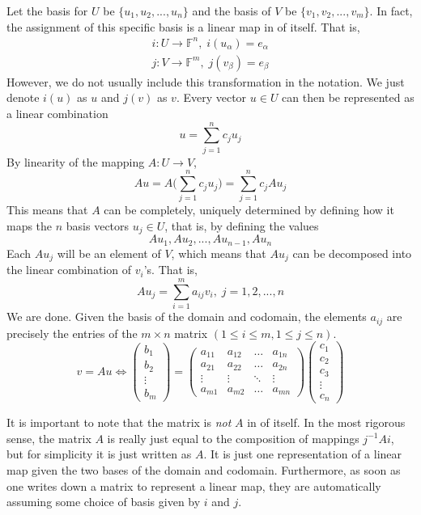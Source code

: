 \documentclass{article}
\theoremstyle{remark}
\theoremstyle{definition}
\begin{document}
    Let the basis for $U$ be $\{ u_1, u_2, ..., u_n\}$ and the basis of $V$ be $\{v_1, v_2, ..., v_m\}$. In fact, the assignment of this specific basis is a linear map in of itself. That is, 
    \begin{align*}
        i: U \longrightarrow \mathbb{F}^n, \; i(u_\alpha) = e_\alpha  \\
        j: V \longrightarrow \mathbb{F}^m, \; j(v_\beta) = e_\beta 
    \end{align*}
    However, we do not usually include this transformation in the notation. We just denote $i(u)$ as $u$ and $j(v)$ as $v$. Every vector $u \in U$ can then be represented as a linear combination
    \[u = \sum_{j=1}^n c_j u_j\]
    By linearity of the mapping $A: U \longrightarrow V$, 
    \[ A u = A \bigg( \sum_{j=1}^n c_j u_j \bigg) = \sum_{j=1}^n c_j A u_j \]
    This means that $A$ can be completely, uniquely determined by defining how it maps the $n$ basis vectors $u_j \in U$, that is, by defining the values 
    \[ A u_1, A u_2, ..., A u_{n-1}, A u_n\]
    Each $A u_j$ will be an element of $V$, which means that $A u_j$ can be decomposed into the linear combination of $v_i$'s. That is, 
    \[ A u_j = \sum_{i=1}^m a_{i j} v_i, \; j = 1, 2, ..., n \]
    We are done. Given the basis of the domain and codomain, the elements $a_{i j}$ are precisely the entries of the $m \times n$ matrix $(1 \leq i \leq m, 1 \leq j \leq n)$. 
    \[ v = A u \iff 
    \begin{pmatrix}
     b_1 \\ b_2 \\ \vdots \\ b_m
    \end{pmatrix}
    = \begin{pmatrix}
     a_{1 1} & a_{1 2} & \ldots & a_{1 n} \\
     a_{2 1} & a_{2 2} & \ldots & a_{2 n} \\
     \vdots & \vdots & \ddots & \vdots \\
     a_{m 1} & a_{m 2} & \ldots & a_{m n} 
    \end{pmatrix} \begin{pmatrix}
     c_1 \\ c_2 \\ c_3 \\ \vdots \\ c_n
    \end{pmatrix}\]

    It is important to note that the matrix is \textit{not} $A$ in of itself. In the most rigorous sense, the matrix $A$ is really just equal to the composition of mappings $ j^{-1} A i$, but for simplicity it is just written as $A$. It is just one representation of a linear map given the two bases of the domain and codomain. Furthermore, as soon as one writes down a matrix to represent a linear map, they are automatically assuming some choice of basis given by $i$ and $j$. 
\end{document}
